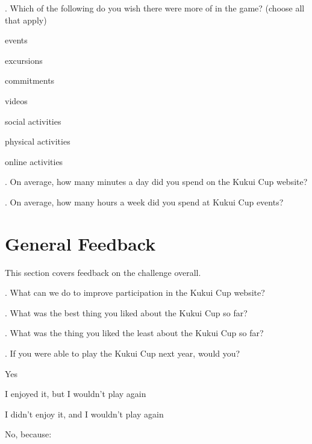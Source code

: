 \vspace{5 mm}
. Which of the following do you wish there were more of in the game? (choose all that apply)

\begin{checkbox}
	\item events
	\item excursions
	\item commitments
	\item videos
	\item social activities
	\item physical activities
	\item online activities
\end{checkbox}

\vspace{5 mm}
. On average, how many minutes a day did you spend on the Kukui Cup website?

\vspace{5 mm}
. On average, how many hours a week did you spend at Kukui Cup events?


\section{General Feedback}

This section covers feedback on the challenge overall.

\vspace{5 mm}
. What can we do to improve participation in the Kukui Cup website?

\vspace{5 mm}
. What was the best thing you liked about the Kukui Cup so far?

\vspace{5 mm}
. What was the thing you liked the least about the Kukui Cup so far?

\vspace{5 mm}
. If you were able to play the Kukui Cup next year, would you?

\begin{radiobutton}
	\item Yes
	\item I enjoyed it, but I wouldn't play again
	\item I didn't enjoy it, and I wouldn't play again
	\item No, because: \underline{\hspace{5cm}}
\end{radiobutton}

